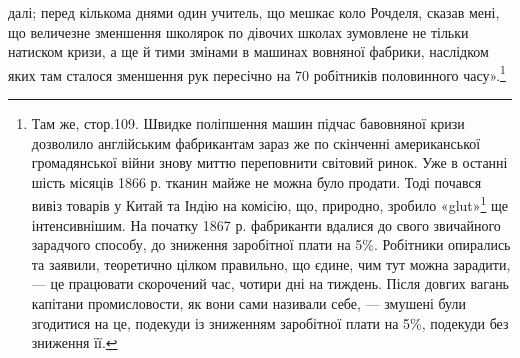 далі; перед кількома днями один учитель, що мешкає коло Рочделя,
сказав мені, що величезне зменшення школярок по дівочих школах
зумовлене не тільки натиском кризи, а ще й тими змінами
в машинах вовняної фабрики, наслідком яких там сталося зменшення
рук пересічно на 70 робітників половинного часу».\footnote{
Там же, стор.109. Швидке поліпшення машин підчас бавовняної
кризи дозволило англійським фабрикантам зараз же по скінченні американської
громадянської війни знову миттю переповнити світовий ринок.
Уже в останні шість місяців 1866 р. тканин майже не можна було продати.
Тоді почався вивіз товарів у Китай та Індію на комісію, що, природно,
зробило «glut»\footnote*{
— пересичення ринку. \emph{Ред.}
} ще інтенсивнішим. На початку 1867 р. фабриканти вдалися
до свого звичайного зарадчого способу, до зниження заробітної
плати на 5\%. Робітники опирались та заявили, теоретично цілком правильно,
що єдине, чим тут можна зарадити, — це працювати скорочений
час, чотири дні на тиждень. Після довгих вагань капітани промисловости,
як вони сами називали себе, — змушені були згодитися на це, подекуди
із зниженням заробітної плати на 5\%, подекуди без зниження її.
}
